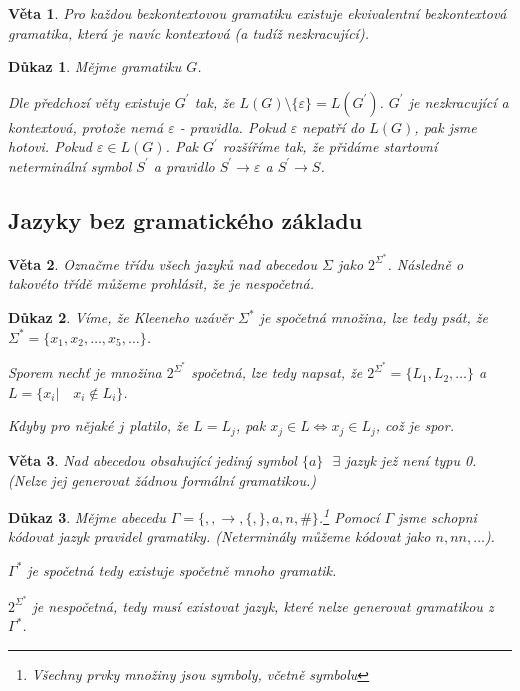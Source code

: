 \documentclass[10pt, a4paper, titlepage]{article}
\theoremstyle{note}
\newtheorem{dukaz}{Důkaz}
\newtheorem{veta}{Věta}
\begin{document}
\begin{veta}
Pro každou bezkontextovou gramatiku existuje ekvivalentní bezkontextová gramatika, která je navíc kontextová (a tudíž nezkracující).
\end{veta}

\begin{dukaz}
Mějme gramatiku $G$.

Dle předchozí věty existuje $G^{'}$ tak, že $L(G) \setminus \lbrace \varepsilon \rbrace = L(G^{'})$.
$G^{'}$ je nezkracující a kontextová, protože nemá $\varepsilon$ - pravidla. Pokud $\varepsilon$ nepatří do $L(G)$, pak jsme hotovi.
Pokud $\varepsilon \in L(G)$. Pak $G^{'}$ rozšíříme tak, že přidáme startovní neterminální symbol $S^{'}$ 
a pravidlo $S^{'} \rightarrow \varepsilon$ a $S^{'} \rightarrow S$.
\end{dukaz}


\subsection{Jazyky bez gramatického základu}

\begin{veta}
Označme třídu všech jazyků nad abecedou $\Sigma$ jako $2^{\Sigma^{*}}$. Následně o takovéto třídě můžeme prohlásit,
že je nespočetná.
\end{veta}

\begin{dukaz}
Víme, že Kleeneho uzávěr $\Sigma^{*}$ je spočetná množina, lze tedy psát,
že $\Sigma^* = \lbrace x_1,x_2,\ldots,x_5,\ldots \rbrace$.

Sporem nechť je množina $2^{\Sigma^{*}}$ spočetná, lze tedy napsat, že $2^{\Sigma^{*}} = \lbrace L_1, L_2, \ldots \rbrace$
a $L = \lbrace x_i | \quad x_i \notin L_i \rbrace$.

Kdyby pro nějaké $j$ platilo, že $L = L_j$, pak $x_j \in L \Longleftrightarrow x_j \in L_j$, což je spor.
\end{dukaz}

\begin{veta}
Nad abecedou obsahující jediný symbol $\lbrace a \rbrace \text{ }\exists$ jazyk jež není typu 0. (Nelze jej generovat žádnou formální gramatikou.)
\end{veta}
\begin{dukaz}
Mějme abecedu $\Gamma = \lbrace , , \rightarrow , \lbrace , \rbrace , a , n, \# \rbrace$.\footnote{Všechny prvky množiny jsou symboly, včetně symbolu } Pomocí $\Gamma$ jsme schopni kódovat jazyk pravidel gramatiky. (Neterminály můžeme kódovat jako $n, nn, \dots$).

$\Gamma^{*}$ je spočetná tedy existuje spočetně mnoho gramatik.

$2^{\Sigma^{*}}$ je nespočetná, tedy musí existovat jazyk, které nelze generovat gramatikou z $\Gamma^{*}$.
\end{dukaz}
\end{document}
